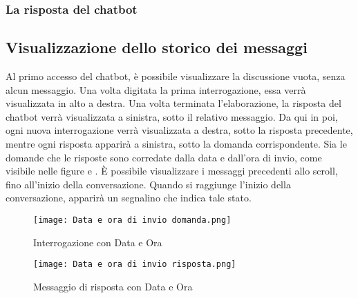 \subsubsection{La risposta del chatbot}


\subsection{Visualizzazione dello storico dei messaggi}
\label{subsec:visualizzazione_storico_messaggi}
Al primo accesso del chatbot, è possibile visualizzare la discussione vuota, senza alcun messaggio.
Una volta digitata la prima interrogazione, essa verrà visualizzata in alto a destra.
Una volta terminata l'elaborazione, la risposta del chatbot verrà visualizzata a sinistra, sotto il relativo messaggio.
Da qui in poi, ogni nuova interrogazione verrà visualizzata a destra, sotto la risposta precedente, mentre ogni risposta apparirà a sinistra, sotto la domanda corrispondente.
Sia le domande che le risposte sono corredate dalla data e dall'ora di invio, come visibile nelle figure  e .
È possibile visualizzare i messaggi precedenti allo scroll, fino all'inizio della conversazione. Quando si raggiunge l'inizio della conversazione, apparirà un segnalino che indica tale stato.

\begin{figure}[!ht]
    \centering
    \begin{minipage}{.45\textwidth}
        \centering
        \texttt{[image: Data e ora di invio domanda.png]}
        \caption{\centering Interrogazione con Data e Ora}
        \label{fig:Data e ora di invio domanda}
    \end{minipage}%
    \hfill
    \begin{minipage}{.45\textwidth}
        \centering
        \texttt{[image: Data e ora di invio risposta.png]}
        \caption{\centering Messaggio di risposta con Data e Ora}
        \label{fig:Data e ora di invio risposta}
    \end{minipage}
\end{figure}


